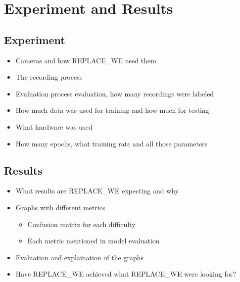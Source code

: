 \chapter{Experiment and Results}

\section{Experiment}
\label{sec:experiment}

\begin{itemize}
  \item Cameras and how REPLACE_WE used them
  \item The recording process
  \item Evaluation process evaluation, how many recordings were labeled
  \item How much data was used for training and how much for testing
  \item What hardware was used
  \item How many epochs, what training rate and all those parameters
\end{itemize}

\section{Results}

\begin{itemize}
  \item What results are REPLACE_WE expecting and why
  \item Graphs with different metrics
  
\begin{itemize}
    \item Confusion matrix for each difficulty
    \item Each metric mentioned in model evaluation
\end{itemize}

  \item Evaluation and explaination of the graphs
  \item Have REPLACE_WE achieved what REPLACE_WE were looking for?
\end{itemize}

